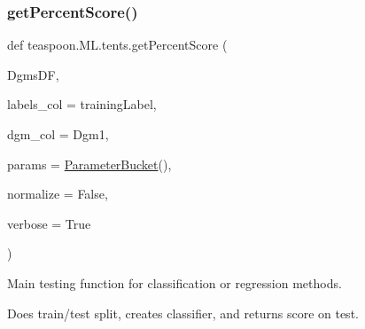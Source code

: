 \subsubsection{\texorpdfstring{get\+Percent\+Score()}{getPercentScore()}}
{\footnotesize\ttfamily def teaspoon.\+M\+L.\+tents.\+get\+Percent\+Score (\begin{DoxyParamCaption}\item[{}]{Dgms\+DF,  }\item[{}]{labels\+\_\+col = {\ttfamily \textquotesingle{}trainingLabel\textquotesingle{}},  }\item[{}]{dgm\+\_\+col = {\ttfamily \textquotesingle{}Dgm1\textquotesingle{}},  }\item[{}]{params = {\ttfamily \hyperlink{classteaspoon_1_1_m_l_1_1tents_1_1_parameter_bucket}{Parameter\+Bucket}()},  }\item[{}]{normalize = {\ttfamily False},  }\item[{}]{verbose = {\ttfamily True} }\end{DoxyParamCaption})}



Main testing function for classification or regression methods.

Does train/test split, creates classifier, and returns score on test.


